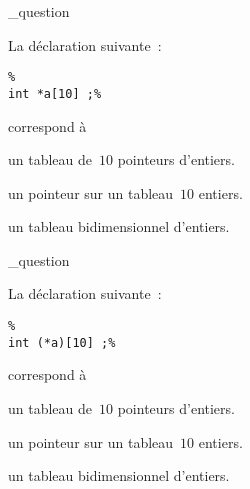 \qcm_question{%
La d\'eclaration suivante~:
\begin{verbatim}%
int *a[10] ;%
\end{verbatim}%
correspond \`a
}%
{%
\item%
un tableau de~$10$ pointeurs d'entiers.%
\item%
un pointeur sur un tableau~$10$ entiers.%
\item%
un tableau bidimensionnel d'entiers.%
}%
\qcm_question{%
La d\'eclaration suivante~:
\begin{verbatim}%
int (*a)[10] ;%
\end{verbatim}%
correspond \`a
}%
{%
\item%
un tableau de~$10$ pointeurs d'entiers.%
\item%
un pointeur sur un tableau~$10$ entiers.%
\item%
un tableau bidimensionnel d'entiers.%
}%


